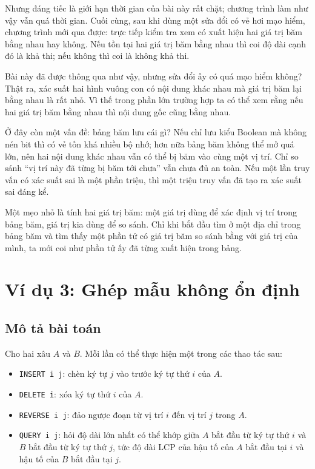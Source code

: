 \documentclass[11pt]{article}
\begin{document}
Nhưng đáng tiếc là giới hạn thời gian của bài này rất chặt; chương trình làm
như vậy vẫn quá thời gian. Cuối cùng, sau khi dùng một sửa đổi có vẻ hơi mạo
hiểm, chương trình mới qua được: trực tiếp kiểm tra xem có xuất hiện hai giá
trị băm bằng nhau hay không. Nếu tồn tại hai giá trị băm bằng nhau thì coi
độ dài cạnh đó là khả thi; nếu không thì coi là không khả thi.

Bài này đã được thông qua như vậy, nhưng sửa đổi ấy có quá mạo hiểm không?
Thật ra, xác suất hai hình vuông con có nội dung khác nhau mà giá trị băm lại
bằng nhau là rất nhỏ. Vì thế trong phần lớn trường hợp ta có thể xem rằng
nếu hai giá trị băm bằng nhau thì nội dung gốc cũng bằng nhau.

Ở đây còn một vấn đề: bảng băm lưu cái gì? Nếu chỉ lưu kiểu Boolean mà không
nén bit thì có vẻ tốn khá nhiều bộ nhớ; hơn nữa bảng băm không thể mở quá
lớn, nên hai nội dung khác nhau vẫn có thể bị băm vào cùng một vị trí. Chỉ
so sánh ``vị trí này đã từng bị băm tới chưa'' vẫn chưa đủ an toàn. Nếu một
lần truy vấn có xác suất sai là một phần triệu, thì một triệu truy vấn đã tạo
ra xác suất sai đáng kể.

Một mẹo nhỏ là tính hai giá trị băm: một giá trị dùng để xác định vị trí
trong bảng băm, giá trị kia dùng để so sánh. Chỉ khi bắt đầu tìm ở một địa
chỉ trong bảng băm và tìm thấy một phần tử có giá trị băm so sánh bằng với
giá trị của mình, ta mới coi như phần tử ấy đã từng xuất hiện trong bảng.

\section{Ví dụ 3: Ghép mẫu không ổn định}

\subsection{Mô tả bài toán}

Cho hai xâu $A$ và $B$. Mỗi lần có thể thực hiện một trong các thao tác sau:
\begin{itemize}
  \item \texttt{INSERT i j}: chèn ký tự $j$ vào trước ký tự thứ $i$ của $A$.
  \item \texttt{DELETE i}: xóa ký tự thứ $i$ của $A$.
  \item \texttt{REVERSE i j}: đảo ngược đoạn từ vị trí $i$ đến vị trí $j$
  trong $A$.
  \item \texttt{QUERY i j}: hỏi độ dài lớn nhất có thể khớp giữa $A$ bắt đầu
  từ ký tự thứ $i$ và $B$ bắt đầu từ ký tự thứ $j$, tức độ dài LCP của hậu tố
  của $A$ bắt đầu tại $i$ và hậu tố của $B$ bắt đầu tại $j$.
\end{itemize}
\end{document}

